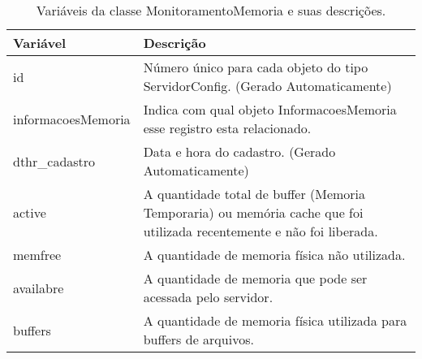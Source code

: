 \begin{table}[!ht]
\centering
\begin{tabular}{|l|l|}
\hline
{\color[HTML]{000000} \textbf{Variável}} & {\color[HTML]{000000} \textbf{Descrição}}                                                                             \\ \hline
id                                       & \multicolumn{1}{p{10.00cm}|}{Número único para cada objeto do tipo ServidorConfig. (Gerado Automaticamente)}                                        \\ \hline
informacoesMemoria                       & \multicolumn{1}{p{10.00cm}|}{Indica com qual objeto InformacoesMemoria esse registro esta relacionado. }\\ \hline
dthr\_cadastro                           & \multicolumn{1}{p{10.00cm}|}{Data e hora do cadastro. (Gerado Automaticamente)} \\ \hline
active                                   & \multicolumn{1}{p{10.00cm}|}{A quantidade total de buffer (Memoria Temporaria) ou memória cache que foi utilizada recentemente e não foi liberada.} \\ \hline
memfree                                  & \multicolumn{1}{p{10.00cm}|}{A quantidade de  memoria física não utilizada.} \\ \hline
availabre                                & \multicolumn{1}{p{10.00cm}|}{A quantidade de memoria que pode ser acessada pelo servidor.} \\ \hline
buffers                                  & \multicolumn{1}{p{10.00cm}|}{A quantidade de memoria física utilizada para buffers  de arquivos.}   \\ \hline
\end{tabular}
\caption[Variáveis da classe MonitoramentoMemoria e suas descrições.]{Variáveis da classe MonitoramentoMemoria e suas descrições.}
\label{Tab:VariaveisMonitoramentoMemoria}
\end{table}

